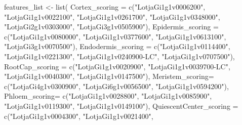 \documentclass[
  letterpaper,
  DIV=11,
  numbers=noendperiod]{scrartcl}
\newenvironment{Shaded}{\begin{snugshade}}{\end{snugshade}}
\newcommand{\FunctionTok}[1]{\textcolor[rgb]{0.28,0.35,0.67}{#1}}
\newcommand{\NormalTok}[1]{\textcolor[rgb]{0.00,0.23,0.31}{#1}}
\newcommand{\OtherTok}[1]{\textcolor[rgb]{0.00,0.23,0.31}{#1}}
\newcommand{\StringTok}[1]{\textcolor[rgb]{0.13,0.47,0.30}{#1}}
\begin{document}
\begin{Shaded}
\begin{Highlighting}[]
\NormalTok{features\_list }\OtherTok{\textless{}{-}} \FunctionTok{list}\NormalTok{(}
    \StringTok{\textquotesingle{}Cortex\_scoring\textquotesingle{}} \OtherTok{=} \FunctionTok{c}\NormalTok{(}\StringTok{"LotjaGi1g1v0006200"}\NormalTok{,}
                 \StringTok{"LotjaGi1g1v0022100"}\NormalTok{,}
                 \StringTok{"LotjaGi1g1v0261700"}\NormalTok{,}
                 \StringTok{"LotjaGi1g1v0348000"}\NormalTok{,}
                 \StringTok{"LotjaGi2g1v0303000"}\NormalTok{,}
                 \StringTok{"LotjaGi3g1v0505900"}\NormalTok{),}
    \StringTok{\textquotesingle{}Epidermis\_scoring\textquotesingle{}} \OtherTok{=} \FunctionTok{c}\NormalTok{(}\StringTok{"LotjaGi1g1v0080000"}\NormalTok{,}
                    \StringTok{"LotjaGi1g1v0377600"}\NormalTok{,}
                    \StringTok{"LotjaGi1g1v0613100"}\NormalTok{,}
                    \StringTok{"LotjaGi3g1v0070500"}\NormalTok{),}
    \StringTok{\textquotesingle{}Endodermis\_scoring\textquotesingle{}} \OtherTok{=} \FunctionTok{c}\NormalTok{(}\StringTok{"LotjaGi1g1v0114400"}\NormalTok{,}
                     \StringTok{"LotjaGi1g1v0221300"}\NormalTok{,}
                     \StringTok{"LotjaGi1g1v0240900{-}LC"}\NormalTok{,}
                     \StringTok{"LotjaGi1g1v0707500"}\NormalTok{), }
    \StringTok{\textquotesingle{}RootCap\_scoring\textquotesingle{}} \OtherTok{=} \FunctionTok{c}\NormalTok{(}\StringTok{"LotjaGi1g1v0020900"}\NormalTok{,}
                   \StringTok{"LotjaGi1g1v0039700{-}LC"}\NormalTok{,}
                   \StringTok{"LotjaGi1g1v0040300"}\NormalTok{,}
                   \StringTok{"LotjaGi1g1v0147500"}\NormalTok{),  }
    \StringTok{\textquotesingle{}Meristem\_scoring\textquotesingle{}}\OtherTok{=} \FunctionTok{c}\NormalTok{(}\StringTok{"LotjaGi4g1v0300900"}\NormalTok{,}
                         \StringTok{"LotjaGi6g1v0056500"}\NormalTok{,}
                         \StringTok{"LotjaGi1g1v0594200"}\NormalTok{),}
    \StringTok{\textquotesingle{}Phloem\_scoring\textquotesingle{}}\OtherTok{=} \FunctionTok{c}\NormalTok{(}\StringTok{"LotjaGi1g1v0028800"}\NormalTok{,}
                \StringTok{"LotjaGi1g1v0085900"}\NormalTok{,}
                \StringTok{"LotjaGi1g1v0119300"}\NormalTok{,}
                \StringTok{"LotjaGi1g1v0149100"}\NormalTok{),}
    \StringTok{\textquotesingle{}QuiescentCenter\_scoring\textquotesingle{}} \OtherTok{=} \FunctionTok{c}\NormalTok{(}\StringTok{"LotjaGi1g1v0004300"}\NormalTok{,}
                           \StringTok{"LotjaGi1g1v0021400"}\NormalTok{,}

\end{Highlighting}
\end{Shaded}
\end{document}
